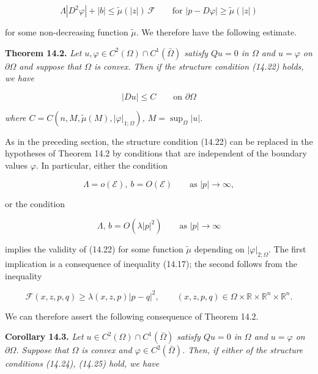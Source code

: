 \begin{equation}
\Lambda|D^2 \varphi| + |b| \leq \tilde{\mu}(|z|)\,\mathscr{F}
\qquad \text{for } |p - D\varphi| \geq \tilde{\mu}(|z|)
\tag{14.22}
\end{equation}

for some non-decreasing function $\tilde{\mu}$. We therefore have the following estimate.

\textbf{Theorem 14.2.} \emph{Let $u, \varphi \in C^2(\Omega)\cap C^1(\bar{\Omega})$ satisfy $Qu = 0$ in $\Omega$ and $u = \varphi$ on $\partial \Omega$
and suppose that $\Omega$ is convex. Then if the structure condition (14.22) holds, we have}

\begin{equation}
|Du| \leq C \qquad \text{on } \partial \Omega
\tag{14.23}
\end{equation}

\emph{where $C = C(n, M, \tilde{\mu}(M), |\varphi|_{1;\Omega})$, $M = \sup_{\Omega} |u|$.}

As in the preceding section, the structure condition (14.22) can be replaced in
the hypotheses of Theorem 14.2 by conditions that are independent of the boundary
values $\varphi$. In particular, either the condition

\begin{equation}
\Lambda = o(\mathscr{E}),\ b = O(\mathscr{E}) \qquad \text{as } |p| \to \infty,
\tag{14.24}
\end{equation}

or the condition

\begin{equation}
\Lambda,\, b = O(\lambda |p|^2) \qquad \text{as } |p| \to \infty
\tag{14.25}
\end{equation}

implies the validity of (14.22) for some function $\tilde{\mu}$ depending on $|\varphi|_{2;\Omega}$.
The first implication is a consequence of inequality (14.17); the second follows from the
inequality

\begin{equation}
\mathscr{F}(x, z, p, q) \geq \lambda(x, z, p)|p-q|^2, \qquad (x, z, p, q) \in \Omega \times \mathbb{R} \times \mathbb{R}^n \times \mathbb{R}^n.
\tag{14.26}
\end{equation}

We can therefore assert the following consequence of Theorem 14.2.

\begin{corollary}\label{gt14-boundary-gradient-14-3}
\textbf{Corollary 14.3.} \emph{Let $u \in C^2(\Omega)\cap C^1(\bar{\Omega})$ satisfy $Qu = 0$ in $\Omega$ and $u = \varphi$ on $\partial \Omega$.
Suppose that $\Omega$ is convex and $\varphi \in C^2(\bar{\Omega})$. Then, if either of the structure conditions
(14.24), (14.25) hold, we have}
\end{corollary}

